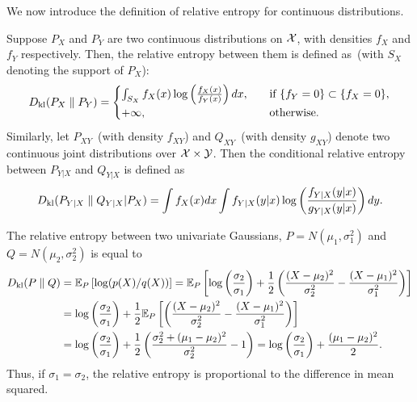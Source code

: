         We now introduce the definition of relative entropy for continuous distributions. 

        \begin{definition}
            \label{def:rel-ent-cont-1} Suppose $P_X$ and $P_Y$ are two continuous distributions on $\mathcal{X}$, with densities $f_X$ and $f_Y$ respectively. Then, the relative entropy between them is defined as~(with $S_X$ denoting the support of $P_X$): 
            \begin{align}
                D_{\text{kl}}(P_X \parallel P_Y) =
                \begin{cases}
                \int_{S_X} f_X(x) \log \left( \frac{f_X(x)}{f_Y(x)} \right) dx,  &\quad \text{if } \{f_Y=0\} \subset \{f_X=0\}, \\    
                 +\infty, &\quad \text{otherwise}. 
                \end{cases}
            \end{align}
            Similarly, let $P_{XY}$~(with density $f_{XY}$) and $Q_{XY}$~(with density $g_{XY}$) denote two continuous joint distributions over $\mathcal{X} \times \mathcal{Y}$. Then the conditional relative entropy between $P_{Y|X}$ and $Q_{Y|X}$ is defined as 
            \begin{align}
                D_{\text{kl}}(P_{Y|X} \parallel Q_{Y|X} | P_X) = \int f_X(x) dx \int f_{Y|X}(y|x) \log \left( \frac{f_{Y|X}(y|x)}{g_{Y|X}(y|x)} \right) dy. 
            \end{align}
        \end{definition}

        \begin{example}
            \label{example:rel-ent-cont-1} 
            The relative entropy between two univariate Gaussians, $P = N(\mu_1, \sigma_1^2)$ and $Q=N(\mu_2, \sigma_2^2)$ is equal to 
            \begin{align}
                D_{\text{kl}}(P \parallel Q) &= \mathbb{E}_P \left[ \log (p(X)/q(X)) \right] = \mathbb{E}_P\left[ \log\left( \frac{\sigma_2}{\sigma_1}\right) + \frac{1}{2}\left( \frac{(X-\mu_2)^2}{\sigma_2^2} - \frac{(X-\mu_1)^2}{\sigma_1^2} \right) \right] \\
                &= \log\left( \frac{\sigma_2}{\sigma_1}\right) + \frac{1}{2} \mathbb{E}_P\left[ \left( \frac{(X-\mu_2)^2}{\sigma_2^2} - \frac{(X-\mu_1)^2}{\sigma_1^2} \right) \right] \\
                &= \log\left( \frac{\sigma_2}{\sigma_1}\right) + \frac{1}{2} \left( \frac{\sigma_2^2 + (\mu_1-\mu_2)^2}{\sigma_2^2}  - 1\right) 
                = \log\left( \frac{\sigma_2}{\sigma_1}\right) + \frac{(\mu_1-\mu_2)^2}{2}. 
            \end{align}
            Thus, if $\sigma_1 = \sigma_2$,  the relative entropy is proportional to the difference in mean squared. 
        \end{example}

